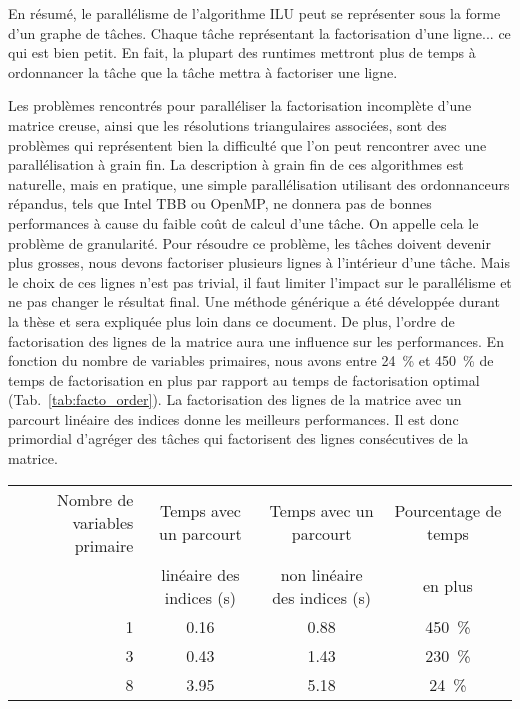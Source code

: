 En résumé, le parallélisme de l'algorithme ILU peut se représenter sous la forme d'un graphe de tâches.
%
Chaque tâche représentant la factorisation d'une ligne... ce qui est bien petit.
%
En fait, la plupart des runtimes mettront plus de temps à ordonnancer la tâche que la tâche mettra à factoriser une ligne.


Les problèmes rencontrés pour paralléliser la factorisation incomplète d'une matrice creuse, ainsi que les résolutions triangulaires associées, sont des problèmes qui représentent bien la difficulté que l'on peut rencontrer avec une parallélisation à grain fin.
%
La description à grain fin de ces algorithmes est naturelle, mais en pratique, une simple parallélisation utilisant des ordonnanceurs répandus, tels que Intel TBB ou OpenMP, ne donnera pas de bonnes performances à cause du faible coût de calcul d'une tâche.
%
On appelle cela le problème de granularité.
%
Pour résoudre ce problème, les tâches doivent devenir plus grosses, nous devons factoriser plusieurs lignes à l'intérieur d'une tâche.
%
Mais le choix de ces lignes n'est pas trivial, il faut limiter l'impact sur le parallélisme et ne pas changer le résultat final.
%
Une méthode générique a été développée durant la thèse et sera expliquée plus loin dans ce document.
%
De plus, l'ordre de factorisation des lignes de la matrice aura une influence sur les performances.
%
En fonction du nombre de variables primaires, nous avons entre 24~\% et 450~\% de temps de factorisation en plus par rapport au temps de factorisation optimal (Tab.~\ref{tab:facto_order}).
%
La factorisation des lignes de la matrice avec un parcourt linéaire des indices donne les meilleurs performances.
%
Il est donc primordial d'agréger des tâches qui factorisent des lignes consécutives de la matrice.

\begin{center}
  \begin{tabular}{|r|c|c|c|}
    \hline
    Nombre de variables primaire & Temps avec un parcourt & Temps avec un parcourt & Pourcentage de temps\\
    & linéaire des indices (s) & non linéaire des indices (s) & en plus \\
    \hline
    1 & 0.16 & 0.88 & 450~\% \\
    \hline
    3 & 0.43 & 1.43 & 230~\% \\
    \hline
    8 & 3.95 & 5.18 & 24~\% \\
    \hline
  \end{tabular}
  \label{tab:facto_order}
\end{center}




